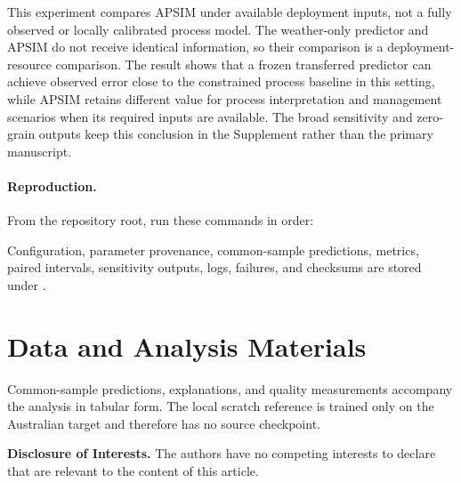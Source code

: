 \documentclass[runningheads]{venue/lncs/llncs}
\begin{document}


This experiment compares APSIM under available deployment inputs, not a fully observed or locally calibrated process model. The weather-only predictor and APSIM do not receive identical information, so their comparison is a deployment-resource comparison. The result shows that a frozen transferred predictor can achieve observed error close to the constrained process baseline in this setting, while APSIM retains different value for process interpretation and management scenarios when its required inputs are available. The broad sensitivity and zero-grain outputs keep this conclusion in the Supplement rather than the primary manuscript.

\paragraph{Reproduction.} From the repository root, run these commands in order:
\begin{quote}\small\ttfamily
{}\par
{}\par
{}\par
{}
\end{quote}
Configuration, parameter provenance, common-sample predictions, metrics, paired intervals, sensitivity outputs, logs, failures, and checksums are stored under .


\section{Data and Analysis Materials}

Common-sample predictions, explanations, and quality measurements accompany the analysis in tabular form. The local scratch reference is trained only on the Australian target and therefore has no source checkpoint.

\noindent\textbf{Disclosure of Interests.} The authors have no competing interests to declare that are relevant to the content of this article.



\end{document}
